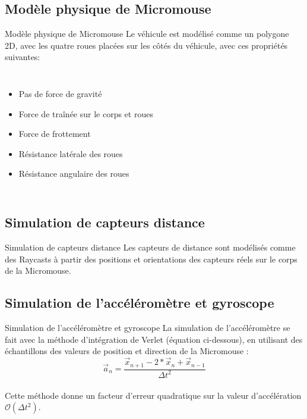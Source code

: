 \documentclass{beamer}
\begin{document}
\subsection{Modèle physique de Micromouse}
\begin{frame}{Modèle physique de Micromouse}
Le véhicule est modélisé comme un polygone 2D, avec les quatre roues placées sur les côtés du véhicule, avec ces propriétés suivantes:
\begin{columns}[c]
\begin{itemize}
    \item Pas de force de gravité
    \item Force de traînée sur le corps et roues
    \item Force de frottement
    \item Résistance latérale des roues
    \item Résistance angulaire des roues
\end{itemize}


\end{columns}
\end{frame}

\subsection{Simulation de capteurs distance}
\begin{frame}{Simulation de capteurs distance}
Les capteurs de distance sont modélisés comme des Raycasts à partir des positions et orientations des capteurs réels sur le corps de la Micromouse.

\end{frame}

\subsection{Simulation de l'accéléromètre et gyroscope}
\begin{frame}{Simulation de l'accéléromètre et gyroscope}
La simulation de l'accéléromètre se fait avec la méthode d'intégration de Verlet (équation ci-dessous), en utilisant des échantillons des valeurs de position et direction de la Micromouse : \\
\begin{equation*}
    \vec{a}_n = \frac{\vec{x}_{n+1} - 2 * \vec{x}_n + \vec{x}_{n-1}}{\Delta t^2}
\end{equation*}\\
Cette méthode donne un facteur d'erreur quadratique sur la valeur d'accélération $\mathcal{O}(\Delta t^2)$.
\end{frame}
\end{document}
